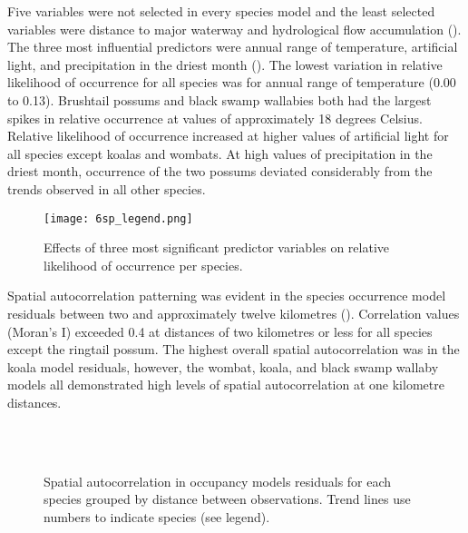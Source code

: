 Five variables were not selected in every species model and the least selected variables were distance to major waterway and hydrological flow accumulation (). The three most influential predictors were annual range of temperature, artificial light, and precipitation in the driest month (). The lowest variation in relative likelihood of occurrence for all species was for annual range of temperature (0.00 to 0.13). Brushtail possums and black swamp wallabies both had the largest spikes in relative occurrence at values of approximately 18 degrees Celsius. Relative likelihood of occurrence increased at higher values of artificial light for all species except koalas and wombats. At high values of precipitation in the driest month, occurrence of the two possums deviated considerably from the trends observed in all other species. 

\begin{figure*}[htp]
  \centering
  \texttt{[image: 6sp\_legend.png]}\\
  \caption[Most significant predictor variables on relative likelihood of occurrence for six mammal species]{Effects of three most significant predictor variables on relative likelihood of occurrence per species.}
  \label{6sp_term_occ}
\end{figure*}

Spatial autocorrelation patterning was evident in the species occurrence model residuals between two and approximately twelve kilometres (). Correlation values (Moran's I) exceeded 0.4 at distances of two kilometres or less for all species except the ringtail possum. The highest overall spatial autocorrelation was in the koala model residuals, however, the wombat, koala, and black swamp wallaby models all demonstrated high levels of spatial autocorrelation at one kilometre distances.

\begin{figure*}[htp]
  \centering
  \\
  \\
  \caption[Spatial autocorrelation in occupancy models residuals for six mammal species]{Spatial autocorrelation in occupancy models residuals for each species grouped by distance between observations. Trend lines use numbers to indicate species (see legend).}
  \label{6sp_sac}
\end{figure*}

